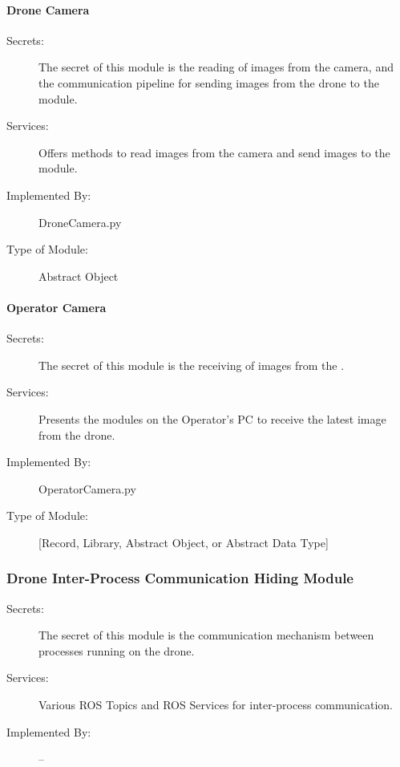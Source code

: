 \documentclass[12pt, titlepage]{article}
\begin{document}
\paragraph{Drone Camera}
\label{Drone Camera}
\begin{description}
\item[Secrets:] The secret of this module is the reading of  images from the camera, and the communication pipeline for sending images from the drone to the  module.
\item[Services:] Offers methods to read images from the camera and send images to the  module.
\item[Implemented By:] DroneCamera.py
\item[Type of Module:] Abstract Object
\end{description}

\paragraph{Operator Camera}
\label{Operator Camera}
\begin{description}
\item[Secrets:] The secret of this module is the receiving of images from the .
\item[Services:] Presents the modules on the Operator's PC to receive the latest image from the drone.
\item[Implemented By:] OperatorCamera.py
\item[Type of Module:] [Record, Library, Abstract Object, or Abstract Data Type]
\end{description}

\subsubsection{Drone Inter-Process Communication Hiding Module}
\begin{description}
\item[Secrets:] The secret of this module is the communication mechanism between processes running on the drone.
\item[Services:] Various ROS Topics and ROS Services for inter-process communication.
\item[Implemented By:] --
\end{description}
\end{document}
